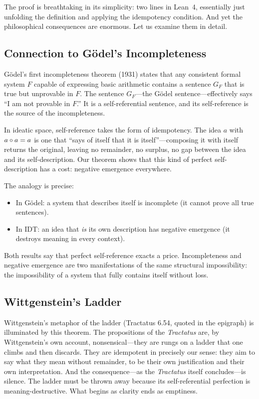 The proof is breathtaking in its simplicity: two lines in Lean~4,
essentially just unfolding the definition and applying the idempotency
condition. And yet the philosophical consequences are enormous. Let us
examine them in detail.

\subsection{Connection to G\"odel's Incompleteness}

G\"odel's first incompleteness theorem (1931) states that any consistent
formal system $F$ capable of expressing basic arithmetic contains a
sentence $G_F$ that is true but unprovable in $F$. The sentence
$G_F$---the G\"odel sentence---effectively says ``I am not provable in
$F$.'' It is a self-referential sentence, and its self-reference is
the source of the incompleteness.

In ideatic space, self-reference takes the form of idempotency. The idea
$a$ with $a \circ a = a$ is one that ``says of itself that it is
itself''---composing it with itself returns the original, leaving no
remainder, no surplus, no gap between the idea and its
self-description. Our theorem shows that this kind of perfect
self-description has a cost: negative emergence everywhere.

The analogy is precise:
\begin{itemize}
\item In G\"odel: a system that describes itself is incomplete (it
cannot prove all true sentences).
\item In IDT: an idea that \emph{is} its own description has negative
emergence (it destroys meaning in every context).
\end{itemize}
Both results say that perfect self-reference exacts a price.
Incompleteness and negative emergence are two manifestations of the
same structural impossibility: the impossibility of a system that
fully contains itself without loss.

\subsection{Wittgenstein's Ladder}

Wittgenstein's metaphor of the ladder (Tractatus 6.54, quoted in the
epigraph) is illuminated by this theorem. The propositions of the
\textit{Tractatus} are, by Wittgenstein's own account, nonsensical---they
are rungs on a ladder that one climbs and then discards. They are
idempotent in precisely our sense: they aim to say what they mean
without remainder, to be their own justification and their own
interpretation. And the consequence---as the \textit{Tractatus} itself
concludes---is silence. The ladder must be thrown away because its
self-referential perfection is meaning-destructive. What begins as
clarity ends as emptiness.

